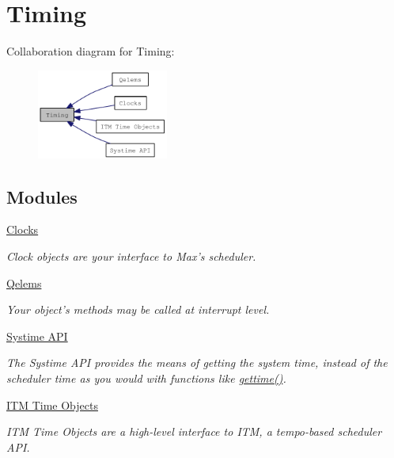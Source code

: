 \hypertarget{group__sched}{
\section{Timing}
\label{group__sched}
}


Collaboration diagram for Timing:\nopagebreak
\begin{figure}[H]
\begin{center}
\leavevmode
\includegraphics[width=122pt]{group__sched}
\end{center}
\end{figure}
\subsection*{Modules}
\begin{DoxyCompactItemize}
\item 
\hyperlink{group__clocks}{Clocks}


\begin{DoxyCompactList}\small\item\em Clock objects are your interface to Max’s scheduler. \item\end{DoxyCompactList}\item 
\hyperlink{group__qelems}{Qelems}


\begin{DoxyCompactList}\small\item\em Your object’s methods may be called at interrupt level. \item\end{DoxyCompactList}\item 
\hyperlink{group__systime}{Systime API}


\begin{DoxyCompactList}\small\item\em The Systime API provides the means of getting the system time, instead of the scheduler time as you would with functions like \hyperlink{group__clocks_gabe5d8b1c9f260d13734a328b2a60ff69}{gettime()}. \item\end{DoxyCompactList}\item 
\hyperlink{group__time}{ITM Time Objects}


\begin{DoxyCompactList}\small\item\em ITM Time Objects are a high-\/level interface to ITM, a tempo-\/based scheduler API. \item\end{DoxyCompactList}\end{DoxyCompactItemize}

